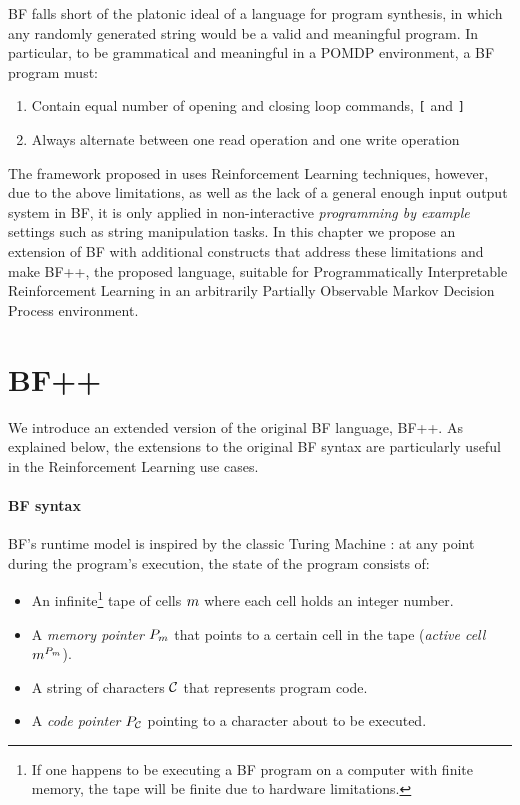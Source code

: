 BF falls short of the platonic ideal of a language for program synthesis, in which any randomly generated string would be a valid and meaningful program.
In particular, to be grammatical and meaningful in a POMDP environment, a BF program must:
\begin{enumerate}
    \item Contain equal number of opening and closing loop commands, \texttt{[} and \texttt{]}
    \item Always alternate between one read operation and one write operation
\end{enumerate}

The framework proposed in \cite{abolafiaNeuralProgramSynthesis2018} uses Reinforcement Learning techniques, however, due to the above limitations, as well as the lack of a general enough input output system in BF, it is only applied in non-interactive \emph{programming by example} settings such as string manipulation tasks.
In this chapter we propose an extension of BF with additional constructs that address these limitations and make BF++, the proposed language, suitable for Programmatically Interpretable Reinforcement Learning in an arbitrarily Partially Observable Markov Decision Process environment.

\newpage
\section{BF++}
\label{sec:language}

We introduce an extended version of the original BF language, BF++. 
As explained below, the extensions to the original BF syntax are particularly useful in the Reinforcement Learning use cases. 

\paragraph{BF syntax}
\label{sec:bf}

BF's runtime model is inspired by the classic Turing Machine \cite{turing}: at any point during the program's execution, the state of the program consists of:

\begin{itemize}
    \item An infinite\footnote{If one happens to be executing a BF program on a computer with finite memory, the tape will be finite due to hardware limitations.} tape of cells $m$ where each cell holds an integer number.
    \item A \textit{memory pointer} $P_m$ that points to a certain cell in the tape (\textit{active cell} $m^{P_m}$).
    \item A string of characters $\mathcal{C}$ that represents program code.
    \item A \textit{code pointer} $P_{\mathcal{C}}$ pointing to a character about to be executed.
\end{itemize}

